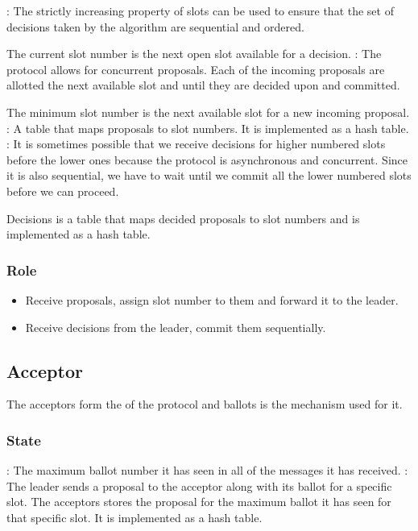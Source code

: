 \begin{itemize}
    : The strictly increasing property of slots
    can be used to ensure that the set of decisions taken by
    the algorithm are sequential and ordered.

    The current slot number is the next open slot available for a decision.
    : The protocol allows for concurrent proposals.
    Each of the incoming proposals are allotted the next available slot and
    until they are decided upon and committed.

    The minimum slot number is the next available slot for a new incoming
    proposal.
    : A table that maps proposals to slot numbers. It is
    implemented as a hash table.
    : It is sometimes possible that we receive decisions for
    higher numbered slots before the lower ones because the protocol is
    asynchronous and concurrent. Since it is also sequential, we have to wait
    until we commit all the lower numbered slots before we can proceed.

    Decisions is a table that maps decided proposals to slot numbers and is
    implemented as a hash table.
\end{itemize}

\subsubsection{Role}

\begin{itemize}
  \item Receive proposals, assign slot number to them and forward it to the
    leader.
  \item Receive decisions from the leader, commit them sequentially.
\end{itemize}

\subsection{Acceptor}

The acceptors form the  of the protocol and ballots is the
mechanism used for it.

\subsubsection{State}

\begin{itemize}
    : The maximum ballot number it has seen in all
    of the messages it has received.
    : The leader sends a proposal to the acceptor along with
    its ballot for a specific slot. The acceptors stores the proposal for
    the maximum ballot it has seen for that specific slot. It is implemented as
    a hash table.
\end{itemize}

